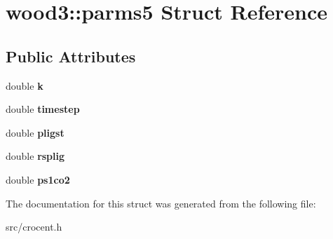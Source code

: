 \hypertarget{structwood3_1_1parms5}{\section{wood3\-:\-:parms5 Struct Reference}
\label{structwood3_1_1parms5}
}
\subsection*{Public Attributes}
\begin{DoxyCompactItemize}
\item 
\hypertarget{structwood3_1_1parms5_a684291888d1a69b578f392f4093f3230}{double {\bfseries k}}\label{structwood3_1_1parms5_a684291888d1a69b578f392f4093f3230}

\item 
\hypertarget{structwood3_1_1parms5_a4887ed1acc4797c00a6c9996c7a41417}{double {\bfseries timestep}}\label{structwood3_1_1parms5_a4887ed1acc4797c00a6c9996c7a41417}

\item 
\hypertarget{structwood3_1_1parms5_a830319b7993b7c4d1bafa01180661ac3}{double {\bfseries pligst}}\label{structwood3_1_1parms5_a830319b7993b7c4d1bafa01180661ac3}

\item 
\hypertarget{structwood3_1_1parms5_aa297f960a6c55124500e796f24c668e4}{double {\bfseries rsplig}}\label{structwood3_1_1parms5_aa297f960a6c55124500e796f24c668e4}

\item 
\hypertarget{structwood3_1_1parms5_ad85a9e5fe5d624061e6bea3cca07ae0f}{double {\bfseries ps1co2}}\label{structwood3_1_1parms5_ad85a9e5fe5d624061e6bea3cca07ae0f}

\end{DoxyCompactItemize}


The documentation for this struct was generated from the following file\-:\begin{DoxyCompactItemize}
\item 
src/crocent.\-h\end{DoxyCompactItemize}
